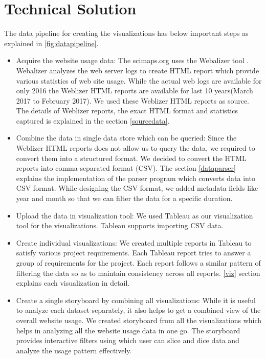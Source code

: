 \section{Technical Solution} \label{techsol}

The data pipeline for creating the visualizations has below important steps
as explained in \ref{fig:datapipeline}.

\begin{itemize}
\item Acquire the website usage data:
The scimaps.org uses the Webalizer tool \cite{weblizer}.
Webalizer
analyzes the web server logs to create HTML report which provide various
statistics of web site usage. While the actual web logs are available for
only 2016 the Weblizer HTML reports are available for last 10 years(March
2017 to February 2017). We used these Weblizer HTML reports as source. The
details of Weblizer reports, the exact HTML format and statistics captured is
 explained in the section \ref{sourcedata}.

\item Combine the data in single data store which can be queried:
Since the Weblizer HTML reports does not allow us to query the data, we
required to convert them into a structured format. We decided to convert the
HTML reports into comma-separated format (CSV). The section \ref{dataparser}
explains the implementation of the parser program which converts data into
CSV format. While designing the CSV format, we added metadata fields like
year and month so that we can filter the data for a specific duration.

\item Upload the data in visualization tool:
We used Tableau \cite{tableau} as our visualization tool for the
visualizations. Tableau supports importing CSV data.
\item Create individual visualizations:
We created multiple reports in Tableau to satisfy various project
requirements. Each Tableau report tries to answer a group of requirements for
 the project. Each report follows a similar pattern of filtering the data so
 as to maintain consistency across all reports. \ref{viz} section explains
 each visualization in detail.
\item Create a single storyboard by combining all visualizations:
While it is useful to analyze each dataset separately, it also helps to get a
 combined view of the overall website usage. We created storyboard from all
 the visualizations which helps in analyzing all the website usage data in
 one go. The storyboard provides interactive filters using which user can
 slice and dice data and analyze the usage pattern effectively.
\end{itemize}

